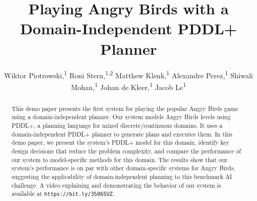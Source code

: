 \documentclass[letterpaper]{article} %
\title{Playing Angry Birds with a Domain-Independent PDDL+ Planner}
\author{
    Wiktor Piotrowski,\textsuperscript{\rm 1}
    Roni Stern,\textsuperscript{\rm 1,2}
    Matthew Klenk,\textsuperscript{\rm 1}
    Alexandre Perez,\textsuperscript{\rm 1}
    Shiwali Mohan,\textsuperscript{\rm 1}
    Johan de Kleer,\textsuperscript{\rm 1}
    Jacob Le\textsuperscript{\rm 1}
    \\
}
\begin{document}
\maketitle

\begin{abstract}
This demo paper presents the first system for playing  the popular Angry Birds game using a domain-independent planner.
Our system models Angry Birds levels using PDDL+, a planning language for mixed discrete/continuous domains. It uses a domain-independent PDDL+ planner to generate plans and executes them.
In this demo paper, we present the system's PDDL+ model for this domain, identify key design decisions that reduce the problem complexity, and compare the performance of our system to model-specific methods for this domain. The results show that our system's performance is on par with other domain-specific systems for Angry Birds, suggesting the applicability of domain-independent planning to this benchmark AI challenge.
A video explaining and demonstrating the behavior of our system is available at \texttt{https://bit.ly/35065UZ}.
\end{abstract}




\end{document}
